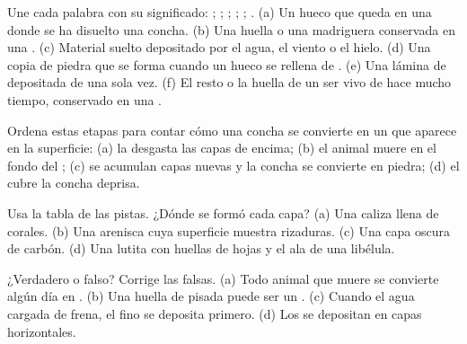 \begin{exercise}[$\star$]\label{exo:g7:sediments-and-fossils:1}
Une cada palabra con su significado: ; ; ; ;
; . (a) Un hueco que queda en una  donde se ha
disuelto una concha. (b) Una huella o una madriguera conservada en una
. (c) Material suelto depositado por el agua, el viento o el hielo.
(d) Una copia de piedra que se forma cuando un hueco se rellena de
. (e) Una lámina de  depositada de una sola vez. (f) El
resto o la huella de un ser vivo de hace mucho tiempo, conservado en una
.
\end{exercise}

\begin{exercise}[$\star$]\label{exo:g7:sediments-and-fossils:2}
Ordena estas etapas para contar cómo una concha se convierte en un 
que aparece en la superficie: (a) la  desgasta las capas de encima;
(b) el animal muere en el fondo del ; (c) se acumulan capas nuevas y la
concha se convierte en piedra; (d) el  cubre la concha deprisa.
\end{exercise}

\begin{exercise}[$\star$]\label{exo:g7:sediments-and-fossils:3}
Usa la tabla de las pistas. ¿Dónde se formó cada capa? (a) Una caliza
llena de corales. (b) Una arenisca cuya superficie muestra rizaduras.
(c) Una capa oscura de carbón. (d) Una lutita con huellas de hojas y el
ala de una libélula.
\end{exercise}

\begin{exercise}[$\star$]\label{exo:g7:sediments-and-fossils:4}
¿Verdadero o falso? Corrige las falsas. (a) Todo animal que muere se
convierte algún día en . (b) Una huella de pisada puede ser un .
(c) Cuando el agua cargada de  frena, el  fino se deposita
primero. (d) Los  se depositan en capas horizontales.
\end{exercise}

